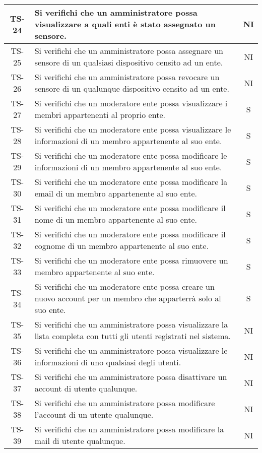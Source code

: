 \begin{center}
\begin{longtable}{|c|p{10cm}|c|}
			 \hline
			 TS-24 & Si verifichi che un amministratore possa visualizzare a quali enti è stato assegnato un sensore. & NI \\
			 \hline
			 TS-25 & Si verifichi che un amministratore possa assegnare un sensore di un qualsiasi dispositivo censito ad un ente. & NI \\
			 \hline
			 TS-26 & Si verifichi che un amministratore possa revocare un sensore di un qualunque dispositivo censito ad un ente. & NI \\
			 \hline
			 TS-27 &  Si verifichi che un moderatore ente possa visualizzare i membri appartenenti al proprio ente. & S \\
			 \hline
			 TS-28 & Si verifichi che un moderatore ente possa visualizzare le informazioni di un membro appartenente al suo ente. & S \\
			 \hline
			 TS-29 & Si verifichi che un moderatore ente possa modificare le informazioni di un membro appartenente al suo ente. & S \\
			 \hline
			 TS-30 & Si verifichi che un moderatore ente possa modificare la email di un membro appartenente al suo ente. & S \\
			 \hline
			 TS-31 & Si verifichi che un moderatore ente possa modificare il nome di un membro appartenente al suo ente. & S \\
			 \hline
			 TS-32 & Si verifichi che un moderatore ente possa modificare il cognome di un membro appartenente al suo ente. & S \\
			 \hline
			 TS-33 & Si verifichi che un moderatore ente possa rimuovere un membro appartenente al suo ente. & S \\
			 \hline
			 TS-34 & Si verifichi che un moderatore ente possa creare un nuovo account per un membro che apparterrà solo al suo ente. & S \\
			 \hline
			 TS-35 & Si verifichi che un amministratore possa visualizzare la lista completa con tutti gli utenti registrati nel sistema. & NI \\
			 \hline
			 TS-36 & Si verifichi che un amministratore possa visualizzare le informazioni di uno qualsiasi degli utenti. & NI \\
			 \hline
			 TS-37 & Si verifichi che un amministratore possa disattivare un account di utente qualunque. & NI \\
			 \hline
			 TS-38 & Si verifichi che un amministratore possa modificare l'account di un utente qualunque. & NI \\
			 \hline
			 TS-39 & Si verifichi che un amministratore possa modificare la mail di utente qualunque. & NI \\

\end{longtable}
\end{center}
